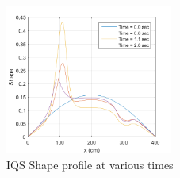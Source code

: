 \documentclass{elsarticle}
\newcommand{\jcr}[1]{\textcolor{red}{jcr: #1}}
\begin{document}
\begin{figure}[!htbp]
\centering
\includegraphics[width=0.49\textwidth]{figures/1D_shape2.png}
\caption{IQS Shape profile at various times}
\label{fig:1D_shape}
\end{figure}
\end{document}
